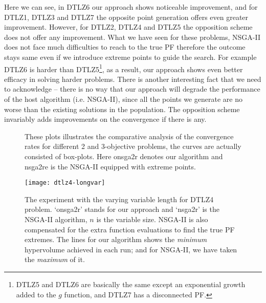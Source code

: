 \documentclass{sig-alternate-05-2015}
\begin{document}
Here we can see, in DTLZ6 our approach shows noticeable improvement, and for DTLZ1, DTLZ3 and DTLZ7 the opposite point generation offers even greater improvement. However, for DTLZ2, DTLZ4 and DTLZ5 the opposition scheme does not offer any improvement. What we have seen for these problems, NSGA-II does not face much difficulties to reach to the true PF therefore the outcome stays same even if we introduce extreme points to guide the search. For example DTLZ6 is harder than DTLZ5\footnote{DTLZ5 and DTLZ6 are basically the same except an exponential growth added to the \(g\) function, and DTLZ7 has a disconnected PF.}, as a result, our approach shows even better efficacy in solving harder problems. There is another interesting fact that we need to acknowledge -- there is no way that our approach will degrade the performance of the host algorithm (i.e. NSGA-II), since all the points we generate are no worse than the existing solutions in the population. The opposition scheme invariably adds improvements on the convergence if there is any. 

%
\begin{figure*}[pb!]
	\centering
	\hfill
		\caption{These plots illustrates the comparative analysis of the convergence rates for different 2 and 3-objective problems, the curves are actually consisted of box-plots. Here onsga2r denotes our algorithm and nsga2re is the NSGA-II equipped with extreme points.}
	\label{plot:nsga2re-hv}
\end{figure*}
%
\begin{figure}[!tp]
	\centering
	\texttt{[image: dtlz4-longvar]}
	\caption{The experiment with the varying variable length for DTLZ4 problem. `onsga2r' stands for our approach and `nsga2r' is the NSGA-II algorithm, \(n\) is the variable size. NSGA-II is also compensated for the extra function evaluations to find the true PF extremes. The lines for our algorithm shows the \textit{minimum} hypervolume achieved in each run; and for NSGA-II, we have taken the \textit{maximum} of it.}
	\label{plot:longvar}\vspace{-10.0pt}
\end{figure}
%
\end{document}
